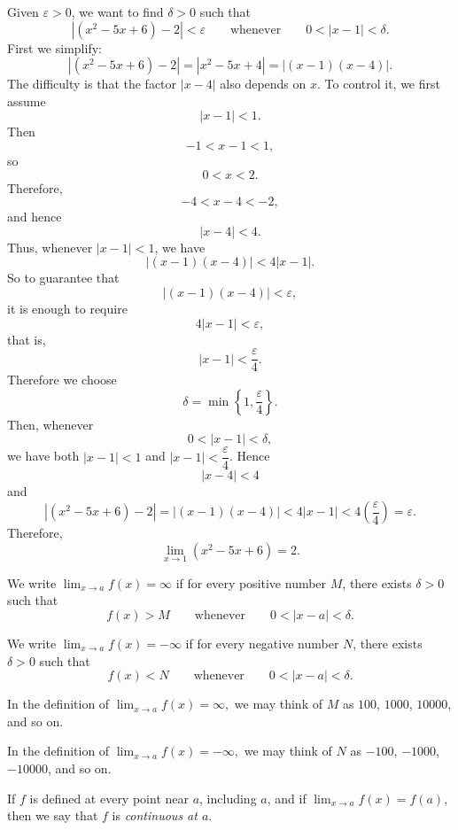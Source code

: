 \begin{solution}
Given \(\varepsilon>0\), we want to find \(\delta>0\) such that
\[
|(x^{2}-5x+6)-2|<\varepsilon
\qquad \text{whenever} \qquad
0<|x-1|<\delta.
\]
First we simplify:
\[
|(x^{2}-5x+6)-2|
=
|x^{2}-5x+4|
=
|(x-1)(x-4)|.
\]
The difficulty is that the factor \(|x-4|\) also depends on \(x\). To control it, we first assume
\[
|x-1|<1.
\]
Then
\[
-1<x-1<1,
\]
so
\[
0<x<2.
\]
Therefore,
\[
-4<x-4<-2,
\]
and hence
\[
|x-4|<4.
\]
Thus, whenever \(|x-1|<1\), we have
\[
|(x-1)(x-4)|<4|x-1|.
\]
So to guarantee that
\[
|(x-1)(x-4)|<\varepsilon,
\]
it is enough to require
\[
4|x-1|<\varepsilon,
\]
that is,
\[
|x-1|<\frac{\varepsilon}{4}.
\]
Therefore we choose
\[
\delta=\min\left\{1,\frac{\varepsilon}{4}\right\}.
\]
Then, whenever
\[
0<|x-1|<\delta,
\]
we have both \(|x-1|<1\) and \(|x-1|<\dfrac{\varepsilon}{4}\). Hence
\[
|x-4|<4
\]
and
\[
|(x^{2}-5x+6)-2|
=
|(x-1)(x-4)|
<
4|x-1|
<
4\left(\frac{\varepsilon}{4}\right)
=
\varepsilon.
\]
Therefore,
\[
\lim_{x\to 1} (x^{2}-5x+6)=2.
\]
\end{solution}

\begin{definition}
We write
\(\displaystyle
\lim_{x\to a} f(x)=\infty
\)
if for every positive number \(M\), there exists \(\delta>0\) such that
\[
f(x)>M
\qquad \text{whenever} \qquad
0<|x-a|<\delta.
\]
\end{definition}

\begin{definition}
We write
\(\displaystyle
\lim_{x\to a} f(x)=-\infty
\)
if for every negative number \(N\), there exists \(\delta>0\) such that
\[
f(x)<N
\qquad \text{whenever} \qquad
0<|x-a|<\delta.
\]
\end{definition}

\begin{remark}
In the definition of
\(\displaystyle
\lim_{x\to a} f(x)=\infty,
\)
we may think of \(M\) as \(100\), \(1000\), \(10000\), and so on.
\end{remark}

\begin{remark}
In the definition of
\(\displaystyle
\lim_{x\to a} f(x)=-\infty,
\)
we may think of \(N\) as \(-100\), \(-1000\), \(-10000\), and so on.
\end{remark}

\begin{definition}
If \(f\) is defined at every point near \(a\), including \(a\), and if
\(\displaystyle
\lim_{x\to a} f(x)=f(a),
\)
then we say that \(f\) is \emph{continuous at \(a\)}.
\end{definition}

